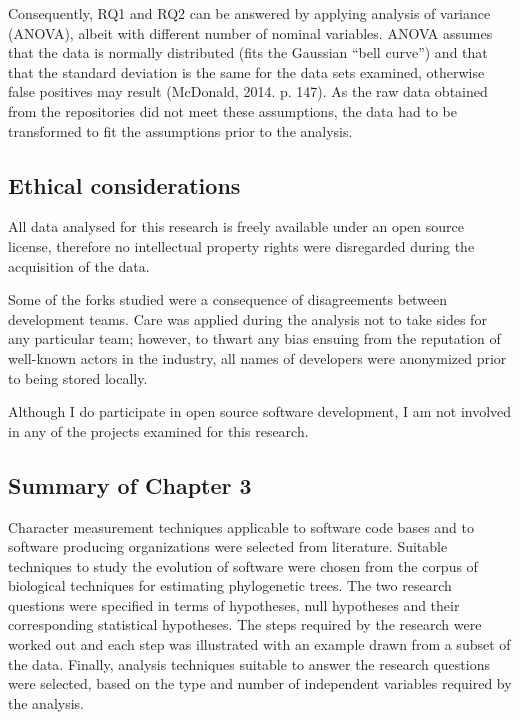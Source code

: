 Consequently, RQ1 and RQ2 can be answered by applying analysis of variance (ANOVA), albeit with different number of nominal variables. ANOVA assumes that the data is normally distributed (fits the Gaussian “bell curve”) and that that the standard deviation is the same for the data sets examined, otherwise false positives may result (McDonald, 2014. p. 147). As the raw data obtained from the repositories did not meet these assumptions, the data had to be transformed to fit the assumptions prior to the analysis.

\subsection{Ethical considerations}
All data analysed for this research is freely available under an open source license, therefore no intellectual property rights were disregarded during the acquisition of the data. 

Some of the forks studied were a consequence of disagreements between development teams. Care was applied during the analysis not to take sides for any particular team; however, to thwart any bias ensuing from the reputation of well-known actors in the industry, all names of developers were anonymized prior to being stored locally.

Although I do participate in open source software development, I am not involved in any of the projects examined for this research.

\subsection{Summary of Chapter 3}
Character measurement techniques applicable to software code bases and to software producing organizations were selected from literature. Suitable techniques to study the evolution of software were chosen from the corpus of biological techniques for estimating phylogenetic trees. The two research questions were specified in terms of hypotheses, null hypotheses and their corresponding statistical hypotheses. The steps required by the research were worked out and each step was illustrated with an example drawn from a subset of the data. Finally, analysis techniques suitable to answer the research questions were selected, based on the type and number of independent variables required by the analysis.


